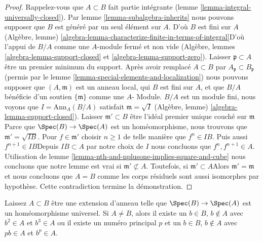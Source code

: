 \begin{proof}

Rappelez-vous que $A \subset B$ fait partie intégrante (lemme \ref{lemma-integral-universally-closed}). Par lemme \ref{lemma-subalgebra-inherits}
nous pouvons supposer que $B$ est généré par un seul élément sur $A$. D'où $B$ est fini sur $A$
(Algèbre, lemme) \ref{algebra-lemma-characterize-finite-in-terms-of-integral}D'où l'appui de $B/A$ comme une $A$-module fermé et non vide (Algèbre, lemmes
\ref{algebra-lemma-support-closed} et \ref{algebra-lemma-support-zero}). Laisser $\mathfrak p \subset A$ être un premier minimum du support. Après avoir remplacé $A \subset B$ par
$A_\mathfrak p \subset B_\mathfrak p$ (permis par le lemme \ref{lemma-special-elements-and-localization}) nous pouvons supposer que $(A, \mathfrak m)$ est un anneau local, qui $B$ est fini sur $A$, et que $B/A$ bénéficie d'un soutien $\{\mathfrak m\}$
comme une $A$- Module. $B/A$ est un module fini, nous voyons que $I = \text{Ann}_A(B/A)$ satisfait $\mathfrak m = \sqrt{I}$
(Algèbre, lemme) \ref{algebra-lemma-support-closed}). Laisser $\mathfrak m' \subset B$ être l'idéal premier unique couché sur
$\mathfrak m$Parce que $\Spec(B) \to \Spec(A)$ est un homéomorphisme, nous trouvons que $\mathfrak m' = \sqrt{IB}$. Pour $f \in \mathfrak m'$ choisir $n \geq 1$ de telle manière que
$f^n \in IB$. Puis aussi $f^{n + 1} \in IB$Depuis $IB \subset A$ par notre choix de $I$ nous concluons que
$f^n, f^{n + 1} \in A$. Utilisation de lemme \ref{lemma-nth-and-nplusone-implies-square-and-cube}
nous concluons que notre lemme est vrai si $\mathfrak m' \not \subset A$. Toutefois, si $\mathfrak m' \subset A$Alors $\mathfrak m' = \mathfrak m$
et nous concluons que $A = B$ comme les corps résiduels sont aussi isomorphes par hypothèse. Cette contradiction termine la démonstration.

\end{proof}

\begin{lemma}

\label{lemma-pth-power-and-multiple}
Laissez $A \subset B$ être une extension d'anneau telle que $\Spec(B) \to \Spec(A)$ est un homéomorphisme universel. Si $A \not = B$, alors il existe un $b \in B$, $b \not \in A$ avec $b^2 \in A$ et $b^3 \in A$ ou il existe un numéro principal $p$ et un $b \in B$, $b \not \in A$ avec $pb \in A$ et $b^p \in A$.
\end{lemma}

